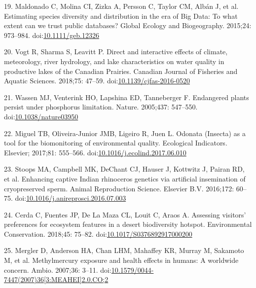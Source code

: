\documentclass[10pt,letterpaper]{article}
\begin{document}
\hypertarget{ref-Maldonado2015}{}
19. Maldonado C, Molina CI, Zizka A, Persson C, Taylor CM, Albán J, et
al. Estimating species diversity and distribution in the era of Big
Data: To what extent can we trust public databases? Global Ecology and
Biogeography. 2015;24: 973--984.
doi:\href{https://doi.org/10.1111/geb.12326}{10.1111/geb.12326}

\hypertarget{ref-Vogt2018}{}
20. Vogt R, Sharma S, Leavitt P. Direct and interactive effects of
climate, meteorology, river hydrology, and lake characteristics on water
quality in productive lakes of the Canadian Prairies. Canadian Journal
of Fisheries and Aquatic Sciences. 2018;75: 47--59.
doi:\href{https://doi.org/10.1139/cjfas-2016-0520}{10.1139/cjfas-2016-0520}

\hypertarget{ref-Wassen2005}{}
21. Wassen MJ, Venterink HO, Lapshina ED, Tanneberger F. Endangered
plants persist under phosphorus limitation. Nature. 2005;437: 547--550.
doi:\href{https://doi.org/10.1038/nature03950}{10.1038/nature03950}

\hypertarget{ref-Miguel2017}{}
22. Miguel TB, Oliveira-Junior JMB, Ligeiro R, Juen L. Odonata (Insecta)
as a tool for the biomonitoring of environmental quality. Ecological
Indicators. Elsevier; 2017;81: 555--566.
doi:\href{https://doi.org/10.1016/j.ecolind.2017.06.010}{10.1016/j.ecolind.2017.06.010}

\hypertarget{ref-Stoops2016}{}
23. Stoops MA, Campbell MK, DeChant CJ, Hauser J, Kottwitz J, Pairan RD,
et al. Enhancing captive Indian rhinoceros genetics via artificial
insemination of cryopreserved sperm. Animal Reproduction Science.
Elsevier B.V. 2016;172: 60--75.
doi:\href{https://doi.org/10.1016/j.anireprosci.2016.07.003}{10.1016/j.anireprosci.2016.07.003}

\hypertarget{ref-Cerda2018}{}
24. Cerda C, Fuentes JP, De La Maza CL, Louit C, Araos A. Assessing
visitors' preferences for ecosystem features in a desert biodiversity
hotspot. Environmental Conservation. 2018;45: 75--82.
doi:\href{https://doi.org/10.1017/S0376892917000200}{10.1017/S0376892917000200}

\hypertarget{ref-Mergler2007}{}
25. Mergler D, Anderson HA, Chan LHM, Mahaffey KR, Murray M, Sakamoto M,
et al. Methylmercury exposure and health effects in humans: A worldwide
concern. Ambio. 2007;36: 3--11.
doi:\href{https://doi.org/10.1579/0044-7447(2007)36\%5B3:MEAHEI\%5D2.0.CO;2}{10.1579/0044-7447(2007)36{[}3:MEAHEI{]}2.0.CO;2}

\nolinenumbers
\end{document}
